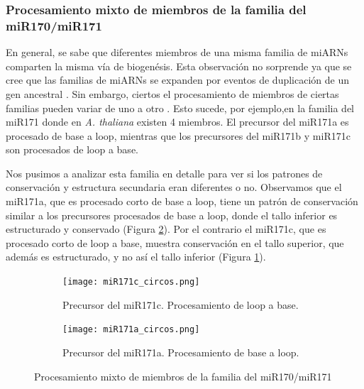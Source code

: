 \subsubsection{Procesamiento mixto de miembros de la familia del miR170/miR171}

En general, se sabe que diferentes miembros de una misma familia de miARNs comparten la misma vía de biogenésis. 
Esta observación no sorprende ya que se cree que las familias de miARNs se expanden por eventos de duplicación de un gen ancestral \citep{pmid15565108}.
Sin embargo, ciertos el procesamiento de miembros de ciertas familias pueden variar de uno a otro \citep{Bologna2013}.
Esto sucede, por ejemplo,en la familia del miR171 donde en \textit{A. thaliana} existen 4 miembros. 
El precursor del miR171a es procesado de base a loop, mientras que los precursores del miR171b y miR171c son procesados de loop a base.

Nos pusimos a analizar esta familia en detalle para ver si los patrones de conservación y estructura secundaria eran diferentes o no.
Observamos que el miR171a, que es procesado corto de base a loop, tiene un patrón de conservación similar a los precursores procesados de base a loop, donde el tallo inferior es estructurado y conservado (Figura \ref{subfig:miR171a_circos}).
Por el contrario el miR171c, que es procesado corto de loop a base, muestra conservación en el tallo superior, que además es estructurado, y no así el tallo inferior (Figura \ref{subfig:miR171c_circos}).



\begin{landscape}
	\begin{figure}
	\centering
	\begin{subfigure}{.65\textwidth}
	  \centering
	  \texttt{[image: miR171c\_circos.png]}
	  \caption{Precursor del miR171c. Procesamiento de loop a base. }
	  \label{subfig:miR171c_circos}
	\end{subfigure}
	\begin{subfigure}{.65\textwidth}
	  \centering
	  \texttt{[image: miR171a\_circos.png]}
	  \caption{Precursor del miR171a. Procesamiento de base a loop.}
	  \label{subfig:miR171a_circos}
	\end{subfigure}
	\caption{Procesamiento mixto de miembros de la familia del miR170/miR171}
	\label{fig:familia_miR171_circos}
	\end{figure}
\end{landscape}


